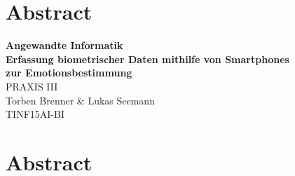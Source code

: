 \documentclass[12pt,titlepage,ngerman]{article}
\begin{document}
\section*{Abstract}
\newpage
{}
\begin{flushright}
	\vspace{1cm}
	{\bfseries Angewandte Informatik} \\
	\vspace{\baselineskip}
	{\bfseries Erfassung biometrischer Daten mithilfe von Smartphones} \\
	{\bfseries zur Emotionsbestimmung} \\
	\vspace{0.5cm}
	PRAXIS III \\
	Torben Brenner \& Lukas Seemann \\
	TINF15AI-BI
\end{flushright}
\section*{Abstract}
\newpage
\singlespacing
{}
\tableofcontents
\newpage
\end{document}
